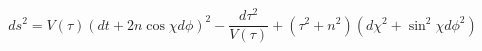 \begin{equation}
ds^{2}=V(\tau )(dt+2n\cos \chi d\phi )^{2}-\frac{d\tau ^{2}}{V(\tau )}+(\tau
^{2}+n^{2})(d\chi ^{2}+\sin ^{2}\chi d\phi ^{2})  \label{TBDS}
\end{equation}%
